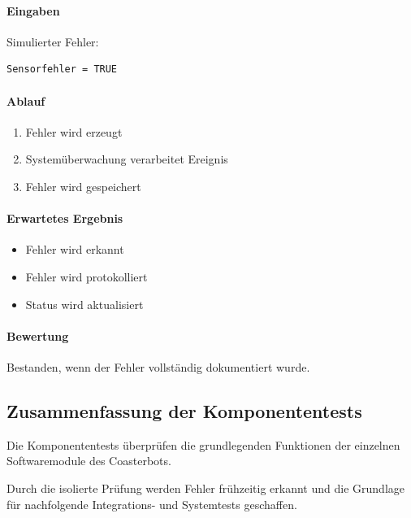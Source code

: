 \paragraph{Eingaben}\label{eingaben-8}

Simulierter Fehler:

\begin{verbatim}
Sensorfehler = TRUE
\end{verbatim}

\paragraph{Ablauf}\label{ablauf-8}

\begin{enumerate}
\def\labelenumi{\arabic{enumi}.}
\tightlist
\item
  Fehler wird erzeugt
\item
  Systemüberwachung verarbeitet Ereignis
\item
  Fehler wird gespeichert
\end{enumerate}

\paragraph{Erwartetes Ergebnis}\label{erwartetes-ergebnis-8}

\begin{itemize}
\tightlist
\item
  Fehler wird erkannt
\item
  Fehler wird protokolliert
\item
  Status wird aktualisiert
\end{itemize}

\paragraph{Bewertung}\label{bewertung-8}

Bestanden, wenn der Fehler vollständig dokumentiert wurde.

\subsection{Zusammenfassung der
Komponententests}\label{zusammenfassung-der-komponententests}

Die Komponententests überprüfen die grundlegenden Funktionen der
einzelnen Softwaremodule des Coasterbots.

Durch die isolierte Prüfung werden Fehler frühzeitig erkannt und die
Grundlage für nachfolgende Integrations- und Systemtests geschaffen.

